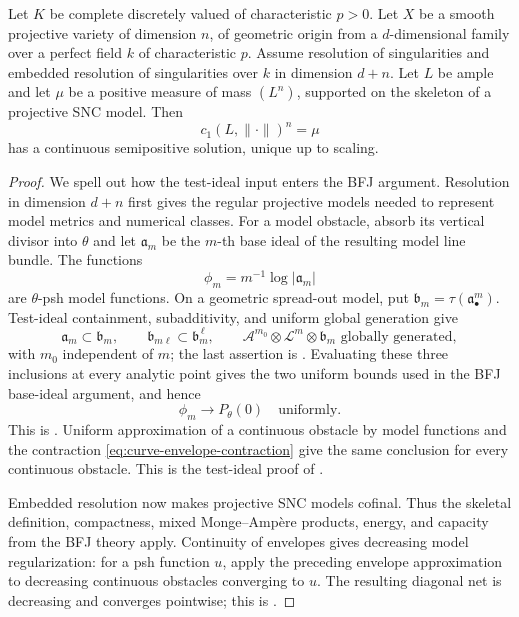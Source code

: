 \begin{theorem}\label{thm:gjkm-positive-characteristic-cy}
Let \(K\) be complete discretely valued of characteristic \(p>0\).  Let
\(X\) be a smooth projective variety of dimension \(n\), of geometric origin
from a \(d\)-dimensional family over a perfect field \(k\) of characteristic
\(p\).  Assume resolution of singularities and embedded resolution of
singularities over \(k\) in dimension \(d+n\).  Let \(L\) be ample and let
\(\mu\) be a positive measure of mass \((L^n)\), supported on the skeleton
of a projective SNC model.  Then
\[
                    c_1(L,\|\cdot\|)^n=\mu
\]
has a continuous semipositive solution, unique up to scaling.
\end{theorem}
\begin{proof}
We spell out how the test-ideal input enters the BFJ argument.  Resolution
in dimension $d+n$ first gives the regular projective models needed to
represent model metrics and numerical classes.  For a model obstacle,
absorb its vertical divisor into $\theta$ and let $\mathfrak a_m$ be the
$m$-th base ideal of the resulting model line bundle.  The functions
\[
                  \phi_m=m^{-1}\log|\mathfrak a_m|
\]
are $\theta$-psh model functions.  On a geometric spread-out model, put
$\mathfrak b_m=\tau(\mathfrak a_\bullet^m)$.  Test-ideal containment,
subadditivity, and uniform global generation give
\[
 \mathfrak a_m\subset\mathfrak b_m,
 \qquad
 \mathfrak b_{m\ell}\subset\mathfrak b_m^{\,\ell},
 \qquad
 \mathcal A^{m_0}\otimes\mathcal L^m\otimes\mathfrak b_m
 \text{ globally generated},
\]
with $m_0$ independent of $m$; the last assertion is
\cite[Theorem~1.3]{GJKM19}.  Evaluating these three inclusions at every
analytic point gives the two uniform bounds used in the BFJ base-ideal
argument, and hence
\[
                   \phi_m\longrightarrow P_\theta(0)
                   \quad\text{uniformly}.
\]
This is \cite[Theorem~7.3]{GJKM19}.  Uniform approximation of a continuous
obstacle by model functions and the contraction
\eqref{eq:curve-envelope-contraction} give the same conclusion for every
continuous obstacle.  This is the test-ideal proof of
\cite[Theorems~1.4 and 8.2]{GJKM19}.

Embedded resolution now makes projective SNC models cofinal.  Thus the
skeletal definition, compactness, mixed Monge--Amp\`ere products, energy,
and capacity from the BFJ theory apply.  Continuity of envelopes gives
decreasing model regularization: for a psh function $u$, apply the preceding
envelope approximation to decreasing continuous obstacles converging to
$u$.  The resulting diagonal net is decreasing and converges pointwise;
this is \cite[Corollary~9.1]{GJKM19}.


\end{proof}

